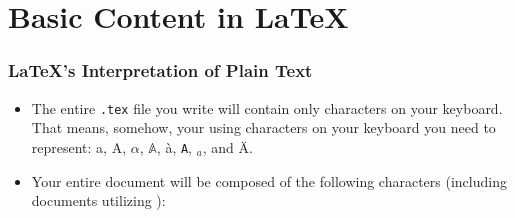 \part{Basic Content in LaTeX{}}

\section{\LaTeX's Interpretation of Plain Text}

\begin{itemize}
\item The entire \texttt{.tex} file you write will contain only characters
  on your keyboard. That means, somehow, your using characters on your
  keyboard you need to represent: a, A, $\alpha$, $\mathbb{A}$, \`a,
  \texttt{A}, $_a$, and \"A.
  
\item Your entire document will be composed of the following characters
  (including documents utilizing \staveVI): \\
\end{itemize}


